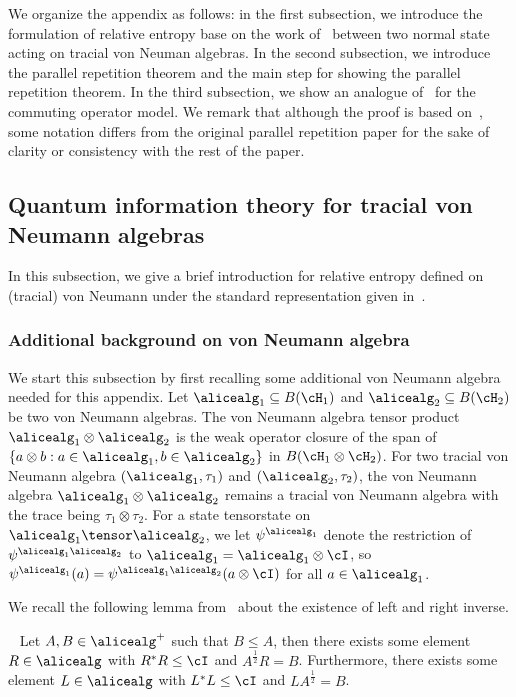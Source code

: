 We organize the appendix as follows: in the first subsection, we introduce the formulation of relative entropy base on the work of~\cite{arakiRelativeEntropyStates1977} between two normal state acting on tracial von Neuman algebras. In the second subsection, we introduce the parallel repetition theorem and the main step for showing the parallel repetition theorem. In the third subsection, we show an analogue of~\cite[Proposition 5.1]{bavarianAnchoredParallelRepetition2021} for the commuting operator model. We remark that although the proof is based on~\cite{bavarianAnchoredParallelRepetition2021}, some notation differs from the original parallel repetition paper for the sake of clarity or consistency with the rest of the paper. 


\subsection{Quantum information theory for tracial von Neumann algebras}\label{sec:qinfo}

In this subsection, we give a brief introduction for relative entropy defined on (tracial) von Neumann under the standard representation given in~\cite{arakiRelativeEntropyStates1977}. 

\subsubsection{Additional background on von Neumann algebra}

We start this subsection by first recalling some additional von Neumann algebra needed for this appendix. Let $\alicealg_1 \subseteq B(\cH_1)$ and $\alicealg_2 \subseteq B(\cH_2)$ be two von Neumann algebras. The von Neumann algebra tensor product $\alicealg_1 \otimes \alicealg_2$ is the weak operator closure of the span of $\{a \otimes b : a \in \alicealg_1, b \in \alicealg_2\}$ in $B(\cH_1 \otimes \cH_2)$. For two tracial von Neumann algebra $(\alicealg_1, \tau_1)$ and $(\alicealg_2, \tau_2)$, the von Neumann algebra $\alicealg_1 \otimes \alicealg_2$ remains a tracial von Neumann algebra with the trace being $\tau_1 \otimes \tau_2$. For a state \gls{tensorstate} on $\alicealg_1 \tensor \alicealg_2$, we let $\psi^{\alicealg_1}$ denote the restriction of $\psi^{\alicealg_1 \alicealg_2}$ to $\alicealg_1 = \alicealg_1 \otimes \cI$, so $\psi^{\alicealg_1}(a) = \psi^{\alicealg_1 \alicealg_2}(a \otimes \cI)$ for all $a \in \alicealg_1$. 

We recall the following lemma from~\cite{linTracialEmbeddableStrategies2024} about the existence of left and right inverse. 
\begin{lemma}\ \label{lem:inversetrick1}
	Let $A, B \in \alicealg^{+}$ such that $B \leq A$, then there exists some element $R \in \alicealg$ with $R^* R \leq \cI$ and $A^{\frac{1}{2}} R  = B$. Furthermore, there exists some element $L \in \alicealg$ with $L^* L \leq \cI$ and $L A^{\frac{1}{2}} = B$.
\end{lemma}

